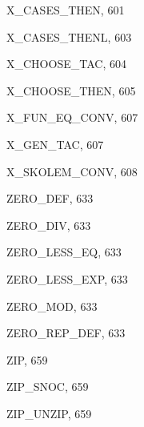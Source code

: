 \begin{theindex}
  \indexspace

  \item {\ptt X\_CASES\_THEN}, 601
  \item {\ptt X\_CASES\_THENL}, 603
  \item {\ptt X\_CHOOSE\_TAC}, 604
  \item {\ptt X\_CHOOSE\_THEN}, 605
  \item {\ptt X\_FUN\_EQ\_CONV}, 607
  \item {\ptt X\_GEN\_TAC}, 607
  \item {\ptt X\_SKOLEM\_CONV}, 608

  \indexspace

  \item {\ptt ZERO\_DEF}, 633
  \item {\ptt ZERO\_DIV}, 633
  \item {\ptt ZERO\_LESS\_EQ}, 633
  \item {\ptt ZERO\_LESS\_EXP}, 633
  \item {\ptt ZERO\_MOD}, 633
  \item {\ptt ZERO\_REP\_DEF}, 633
  \item {\ptt ZIP}, 659
  \item {\ptt ZIP\_SNOC}, 659
  \item {\ptt ZIP\_UNZIP}, 659

\end{theindex}
